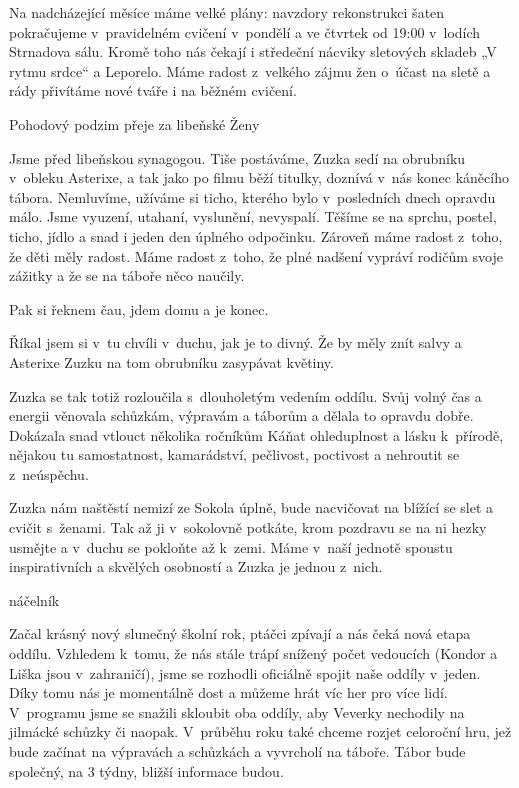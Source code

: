 \documentclass[11pt]{article}
\begin{document}
Na nadcházející měsíce máme velké plány: navzdory rekonstrukci šaten pokračujeme v~pravidelném cvičení v~pondělí a ve čtvrtek od 19:00 v~lodích Strnadova sálu. Kromě toho nás čekají i středeční nácviky sletových skladeb „V rytmu srdce“ a \luv{}Leporelo\ruv{}. Máme radost z~velkého zájmu žen o~účast na sletě a rády přivítáme nové tváře i na běžném cvičení.

Pohodový podzim přeje za libeňské Ženy

\signature{Dubina}{}

\vspace*{24pt}

Jsme před libeňskou synagogou. Tiše postáváme, Zuzka sedí na obrubníku v~obleku Asterixe, a tak jako po filmu běží titulky, doznívá v~nás konec káněcího tábora. Nemluvíme, užíváme si ticho, kterého bylo v~posledních dnech opravdu málo. Jsme vyuzení, utahaní, vyslunění, nevyspalí. Těšíme se na sprchu, postel, ticho, jídlo a snad i jeden den úplného odpočinku. Zároveň máme radost z~toho, že děti měly radost. Máme radost z~toho, že plné nadšení vypráví rodičům svoje zážitky a že se na táboře něco naučily.

Pak si řeknem čau, jdem domu a je konec.

Říkal jsem si v~tu chvíli v~duchu, jak je to divný. Že by měly znít salvy a Asterixe Zuzku na tom obrubníku zasypávat květiny.

Zuzka se tak totiž rozloučila s~dlouholetým vedením oddílu. Svůj volný čas a energii věnovala schůzkám, výpravám a táborům a dělala to opravdu dobře. Dokázala snad vtlouct několika ročníkům Káňat ohleduplnost a lásku k~přírodě, nějakou tu samostatnost, kamarádství, pečlivost, poctivost a nehroutit se z~neúspěchu.

Zuzka nám naštěstí nemizí ze Sokola úplně, bude nacvičovat na blížící se slet a cvičit s~ženami. Tak až ji v~sokolovně potkáte, krom pozdravu se na ni hezky usmějte a v~duchu se pokloňte až k~zemi. Máme v~naší jednotě spoustu inspirativních a skvělých osobností a Zuzka je jednou z~nich.

\signature{Josef Kubišta}{náčelník}

\vspace*{24pt}

Začal krásný nový slunečný školní rok, ptáčci zpívají a nás čeká nová etapa oddílu. Vzhledem k~tomu, že nás stále trápí snížený počet vedoucích (Kondor a Liška jsou v~zahraničí), jsme se rozhodli oficiálně spojit naše oddíly v~jeden. Díky tomu nás je momentálně dost a můžeme hrát víc her pro více lidí. V~programu jsme se snažili skloubit oba oddíly, aby Veverky nechodily na jilmácké schůzky či naopak. V~průběhu roku také chceme rozjet celoroční hru, jež bude začínat na výpravách a schůzkách a vyvrcholí na táboře. Tábor bude společný, na 3 týdny, bližší informace budou.
\end{document}
